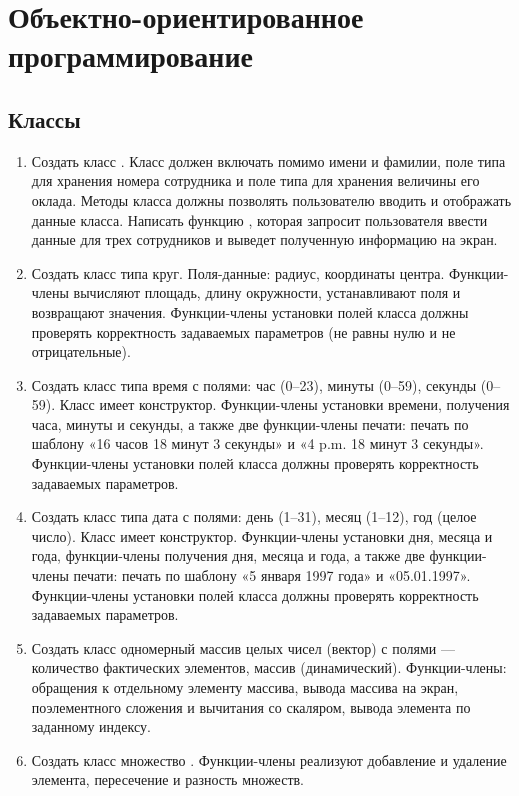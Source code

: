 \chapter{Объектно-ориентированное программирование}
\section{Классы}
\begin{enumerate}[leftmargin=*]
    \item Создать класс . Класс должен включать помимо имени и фамилии, поле типа  для хранения номера сотрудника и поле типа  для хранения величины его оклада. Методы класса должны позволять пользователю вводить и отображать данные класса. Написать функцию , которая запросит пользователя ввести данные для трех сотрудников и выведет полученную информацию на экран.
    \item Создать класс типа круг. Поля-данные: радиус, координаты центра. Функции-члены вычисляют площадь, длину окружности, устанавливают поля и возвращают значения. Функции-члены установки полей класса должны проверять корректность задаваемых параметров (не равны нулю и не отрицательные).
    \item Создать класс типа время с полями: час (0–23), минуты (0–59), секунды (0–59). Класс имеет конструктор. Функции-члены установки времени, получения часа, минуты и секунды, а также две функции-члены печати: печать по шаблону «16 часов 18 минут 3 секунды» и «4 p.m. 18 минут 3 секунды». Функции-члены установки полей класса должны проверять корректность задаваемых параметров.
    \item Создать класс типа дата с полями: день (1–31), месяц (1–12), год (целое число). Класс имеет конструктор. Функции-члены установки дня, месяца и года, функции-члены получения дня, месяца и года, а также две функции-члены печати: печать по шаблону «5 января 1997 года» и «05.01.1997». Функции-члены установки полей класса должны проверять корректность задаваемых параметров.
    \item Создать класс одномерный массив целых чисел (вектор) с полями --- количество фактических элементов, массив (динамический). Функции-члены: обращения к отдельному элементу массива, вывода массива на экран, поэлементного сложения и вычитания со скаляром, вывода элемента по заданному индексу.
    \item Создать класс множество . Функции-члены реализуют добавление и удаление элемента, пересечение и разность множеств.

\end{enumerate}
